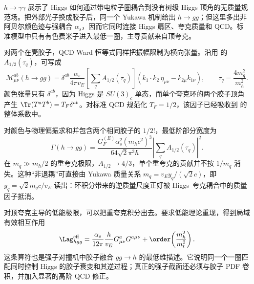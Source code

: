 
$h\to\gamma\gamma$ 展示了 Higgs 如何通过带电粒子圈耦合到没有树级 Higgs 顶角的无质量规范场。把外部光子换成胶子后，同一个 Yukawa 机制给出 $h\to gg$；但这里多出非阿贝尔颜色迹与强耦合 $\alpha_s$，因而它同时连接 Higgs 扇区、夸克质量和 QCD。标准模型中只有有色费米子进入最低一圈，主导贡献来自顶夸克。

对两个在壳胶子，QCD Ward 恒等式同样把振幅限制为横向张量。沿用 的 $A_{1/2}(\tau_q)$，可写成
\begin{equation}
{
\mathcal M^{ab}_{\mu\nu}(h\to gg)
=\delta^{ab}\frac{\alpha_s}{4\pi v_E}
\left[\sum_qA_{1/2}(\tau_q)\right]
\left(k_1\!\cdot k_2\,\eta_{\mu\nu}-k_{2\mu}k_{1\nu}\right),
\qquad
\tau_q=\frac{4m_q^2}{m_h^2}.}
\label{eq:sm-hgg-amplitude-dp94}
\end{equation}
颜色张量只有 $\delta^{ab}$，因为 Higgs 是 $SU(3)_c$ 单态，而单个夸克环的两个胶子顶角产生 $\Tr(T^aT^b)=T_F\delta^{ab}$。对标准 QCD 规范化 $T_F=1/2$，该因子已经吸收到 的整体系数中。

对颜色与物理偏振求和并包含两个相同胶子的 $1/2!$，最低阶部分宽度为
\begin{equation}
{
\Gamma(h\to gg)
=\frac{G_F^{(E)}\alpha_s^2(m_hc^2)^3}
{64\sqrt2\pi^3\hbar}
\left|\sum_qA_{1/2}(\tau_q)\right|^2.}
\label{eq:sm-hgg-width-dp94}
\end{equation}
在 $m_q\gg m_h/2$ 的重夸克极限，$A_{1/2}\to4/3$，单个重夸克的贡献并不按 $1/m_q$ 消失。这种“非退耦”可直接由 Yukawa 质量关系 $m_q=v_Ey_q/(\sqrt2 c)$，即 $y_q=\sqrt2 m_qc/v_E$ 读出：环积分带来的逆质量尺度正好被 Higgs--夸克耦合中的质量因子抵消。

对顶夸克主导的低能极限，可以把重夸克积分出去。要求低能理论重现，得到局域有效相互作用
\begin{equation}
{
\Lag_{hgg}^{\rm eff}
=\frac{\alpha_s}{12\pi}\frac{h}{v_E}
G^a_{\mu\nu}G^{a\mu\nu}
+\order\!\left(\frac{m_h^2}{m_t^2}\right).}
\label{eq:sm-hgg-effective-operator-dp94}
\end{equation}
这条算符也是强子对撞机中胶子融合 $gg\to h$ 的最低维描述。它说明同一个一圈匹配同时控制 Higgs 的胶子衰变和其逆过程；真正的强子截面还必须与胶子 PDF 卷积，并加入显著的高阶 QCD 修正。
